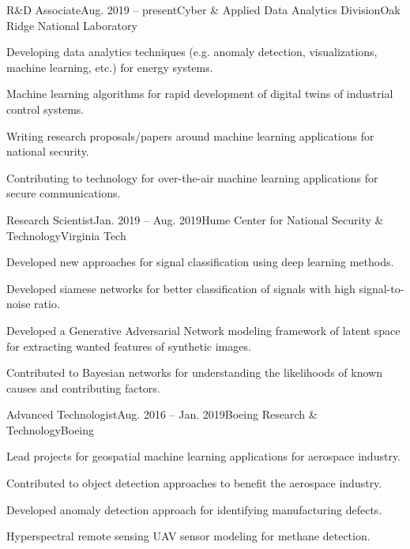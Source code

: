 \documentclass{tidycv} %
\begin{document}
\begin{cvresearches}
\begin{cvresearch}{R{\&}D Associate}{Aug. 2019 -- present}{Cyber \& Applied Data Analytics Division}{Oak Ridge National Laboratory}
 \item Developing data analytics techniques (e.g. anomaly detection, visualizations, machine learning, etc.) for energy systems.
 \item Machine learning algorithms for rapid development of digital twins of industrial control systems.
 \item Writing research proposals/papers around machine learning applications for national security.
 \item Contributing to technology for over-the-air machine learning applications for secure communications. 
\end{cvresearch}
\begin{cvresearch}{Research Scientist}{Jan. 2019 -- Aug. 2019}{Hume Center for National Security \& Technology}{Virginia Tech}
 \item Developed new approaches for signal classification using deep learning methods. 
 \item Developed siamese networks for better classification of signals with high signal-to-noise ratio.
 \item Developed a Generative Adversarial Network modeling framework of latent space for extracting wanted features of synthetic images. 
 \item Contributed to Bayesian networks for understanding the likelihoods of known causes and contributing factors. 
\end{cvresearch}

\begin{cvresearch}{Advanced Technologist}{Aug. 2016 -- Jan. 2019}{Boeing Research \& Technology}{Boeing}
 \item Lead projects for geospatial machine learning applications for aerospace industry.
  \item Contributed to object detection approaches to benefit the aerospace industry.
  \item Developed anomaly detection approach for identifying manufacturing defects.
 \item Hyperspectral remote sensing UAV sensor modeling for methane detection.
\end{cvresearch}

\end{cvresearches}
\end{document}
